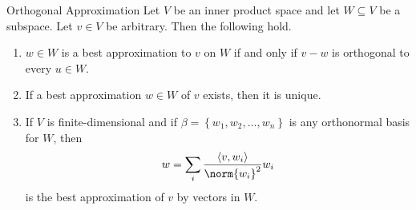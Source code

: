 \documentclass[linearalgebraII]{subfiles}
\begin{document}
    \begin{theorem}{Orthogonal Approximation}
        Let $V$ be an inner product space and let $W\subseteq V$ be a subspace. Let $v\in V$ be arbitrary. Then the following hold.
        \begin{enumerate}
            \item $w\in W$ is a best approximation to $v$ on $W$ if and only if $v-w$ is orthogonal to every $u\in W$.
            \item If a best approximation $w\in W$ of $v$ exists, then it is unique.
            \item If $V$ is finite-dimensional and if $\beta = \left\lbrace w_1,w_2,\ldots,w_n \right\rbrace$ is any orthonormal basis for $W$, then
                \begin{equation*}
                    w = \sum^{}_{i} \frac{\left\langle v, w_i\right\rangle }{\norm{w_i}^2}w_i
                \end{equation*}
                is the best approximation of $v$ by vectors in $W$.
        \end{enumerate}
    \end{theorem}
\end{document}
